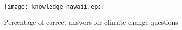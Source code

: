 \begin{figure}[htbp]
	\centering
		\texttt{[image: knowledge-hawaii.eps]}
		\caption{Percentage of correct answers for climate change questions}
\label{fig:knowledge-hawaii}
\end{figure}





